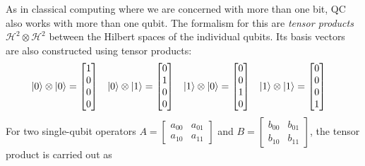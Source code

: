 		As in classical computing where we are concerned with more than one bit, \ac{QC} also works with more than one qubit. The formalism for this are \emph{tensor products} \( \mathcal{H}^2 \otimes \mathcal{H}^2 \) between the Hilbert spaces of the individual qubits. Its basis vectors are also constructed using tensor products:
		\begin{align}
			\ket{0} \otimes \ket{0} &= \begin{bmatrix} 1 \\ 0 \\ 0 \\ 0 \end{bmatrix} &
			\ket{0} \otimes \ket{1} &= \begin{bmatrix} 0 \\ 1 \\ 0 \\ 0 \end{bmatrix} &
			\ket{1} \otimes \ket{0} &= \begin{bmatrix} 0 \\ 0 \\ 1 \\ 0 \end{bmatrix} &
			\ket{1} \otimes \ket{1} &= \begin{bmatrix} 0 \\ 0 \\ 0 \\ 1 \end{bmatrix}
		\end{align}
		For two single-qubit operators \( A = \begin{bmatrix} a_{00} & a_{01} \\ a_{10} & a_{11} \end{bmatrix} \) and \( B = \begin{bmatrix} b_{00} & b_{01} \\ b_{10} & b_{11} \end{bmatrix} \), the tensor product is carried out as
